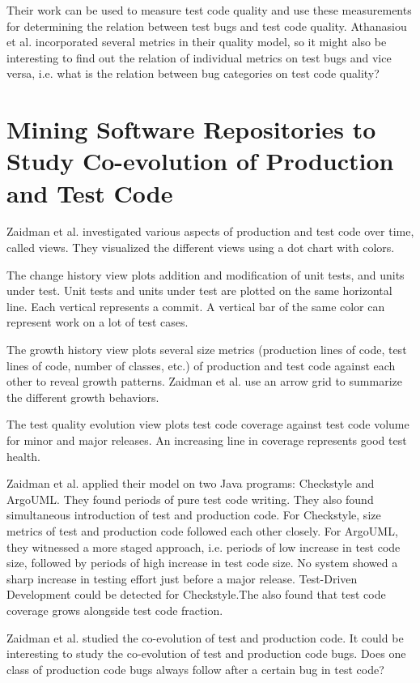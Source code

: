 \documentclass{uvamscse}
\newcommand{\AtestCodeQuality}{Athanasiou et al.}
\newcommand{\ACoEvolution}{Zaidman et al.}
\begin{document}
Their work can be used to measure test code quality and use these measurements for determining the relation between test bugs and test code quality. \AtestCodeQuality{} incorporated several metrics in their quality model, so it might also be interesting to find out the relation of individual metrics on test bugs and vice versa, i.e. what is the relation between bug categories on test code quality? 

\section{Mining Software Repositories to Study Co-evolution of Production and Test Code}
\ACoEvolution{} investigated various aspects of production and test code over time, called views. They visualized the different views using a dot chart with colors.

The change history view plots addition and modification of unit tests, and units under test. Unit tests and units under test are plotted on the same horizontal line. Each vertical represents a commit. A vertical bar of the same color can represent work on a lot of test cases. 

The growth history view plots several size metrics (production lines of code, test lines of code, number of classes, etc.) of production and test code against each other to reveal growth patterns. \ACoEvolution{} use an arrow grid to summarize the different growth behaviors. 

The test quality evolution view plots test code coverage against test code volume for minor and major releases. An increasing line in coverage represents good test health. 

\ACoEvolution{} applied their model on two Java programs: Checkstyle and ArgoUML. They found periods of pure test code writing. They also found simultaneous introduction of test and production code. For Checkstyle, size metrics of test and production code followed each other closely. For ArgoUML, they witnessed a more staged approach, i.e. periods of low increase in test code size, followed by periods of high increase in test code size. No system showed a sharp increase in testing effort just before a major release. Test-Driven Development could be detected for Checkstyle.The also found that test code coverage grows alongside test code fraction. 

\ACoEvolution{} studied the co-evolution of test and production code. It could be interesting to study the co-evolution of test and production code bugs. Does one class of production code bugs always follow after a certain bug in test code?
\end{document}
